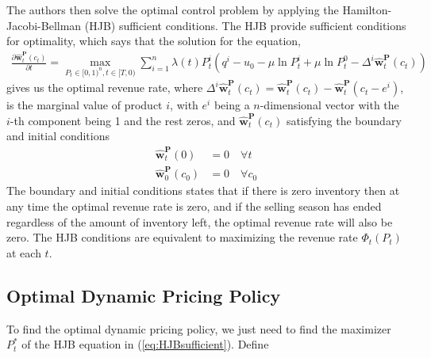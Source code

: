 

The authors then solve the optimal control problem by applying the Hamilton-Jacobi-Bellman (HJB) sufficient conditions. The HJB provide sufficient conditions for optimality, which says that the solution for the equation,
\begin{align}
\frac{\partial \hat{\mathbf{w}}_t^{\mathbf{P}}(c_t)}{\partial t} = \max_{P_t \in [0,1)^n, t \in [T,0)}\sum_{i=1}^{n} \lambda(t)P_t^i \left(q^i-u_0-\mu \ln P_t^i + \mu \ln P_t^0- \Delta^i \hat{\mathbf{w}}_t^{\mathbf{P}}(c_t)\right) \label{eq:HJBsufficient}
\end{align}
gives us the optimal revenue rate, %
where $\Delta^i \hat{\mathbf{w}}_t^{\mathbf{P}}(c_t) = \hat{\mathbf{w}}_t^{\mathbf{P}}(c_t) - \hat{\mathbf{w}}_t^{\mathbf{P}}(c_t-e^i)$, is the marginal value of product $i$, with $e^i$ being a $n$-dimensional vector with the $i$-th component being 1 and the rest zeros, and $\hat{\mathbf{w}}_t^{\mathbf{P}}(c_t)$ satisfying the boundary and initial conditions
\begin{align}
\hat{\mathbf{w}}_t^{\mathbf{P}}(0) &= 0 \quad \forall t\\
\hat{\mathbf{w}}_0^{\mathbf{P}}(c_0) &= 0 \quad \forall c_0
\end{align}
The boundary and initial conditions states that if there is zero inventory then at any time the optimal revenue rate is zero, and if the selling season has ended regardless of the amount of inventory left, the optimal revenue rate will also be zero. The HJB conditions are equivalent to maximizing the revenue rate $\Phi_t(P_t)$ at each $t$.

\subsection{Optimal Dynamic Pricing Policy}

To find the optimal dynamic pricing policy, we just need to find the maximizer $P_t^\ast$ of the HJB equation in (\ref{eq:HJBsufficient}). Define

